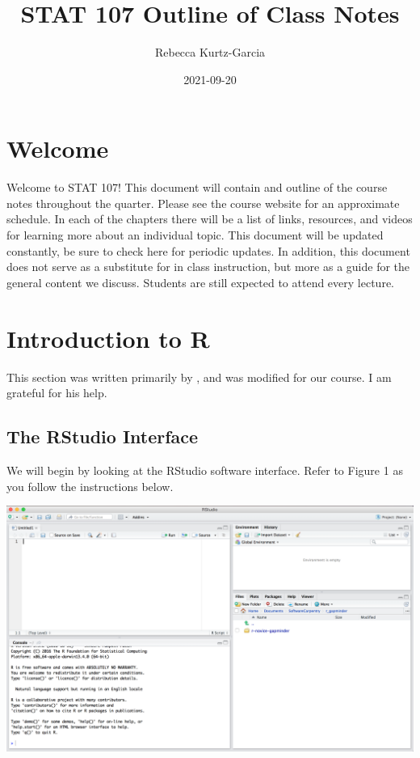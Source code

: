 \documentclass[
]{book}
\title{STAT 107 Outline of Class Notes}
\author{Rebecca Kurtz-Garcia}
\date{2021-09-20}
\begin{document}
\maketitle

{
\setcounter{tocdepth}{1}
\tableofcontents
}
\hypertarget{welcome}{%
\chapter*{Welcome}\label{welcome}}

Welcome to STAT 107! This document will contain and outline of the course notes throughout the quarter. Please see the course website for an approximate schedule. In each of the chapters there will be a list of links, resources, and videos for learning more about an individual topic. This document will be updated constantly, be sure to check here for periodic updates. In addition, this document does not serve as a substitute for in class instruction, but more as a guide for the general content we discuss. Students are still expected to attend every lecture.

\hypertarget{introduction-to-r}{%
\chapter{Introduction to R}\label{introduction-to-r}}

This section was written primarily by \citet{Desharnais2020}, and was modified for our course. I am grateful for his help.

\hypertarget{the-rstudio-interface}{%
\section{\texorpdfstring{The \textbf{RStudio} Interface}{The RStudio Interface}}\label{the-rstudio-interface}}

We will begin by looking at the RStudio software interface. Refer to Figure 1 as you follow the instructions below.

\includegraphics[width=35.53in]{images/rstudio}
\end{document}

